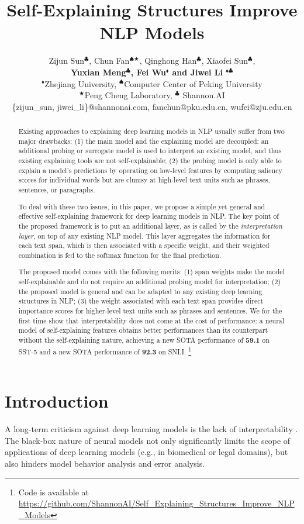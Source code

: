 \documentclass[11pt,a4paper]{article}
\title{Self-Explaining Structures Improve NLP Models}
\date{}
\author{
Zijun Sun$^\clubsuit$, Chun Fan$^{\spadesuit\bigstar}$, Qinghong Han$^\clubsuit$, Xiaofei Sun$^\clubsuit$, \\ 
{\bf Yuxian Meng$^\clubsuit$, Fei Wu$^\blacklozenge$ and Jiwei Li $^{\blacklozenge\clubsuit}$}\\
  $^\blacklozenge$Zhejiang University,
  $^\spadesuit$Computer Center of Peking University \\
  $^\bigstar$Peng Cheng Laboratory,  
  $^\clubsuit$ Shannon.AI\\
  \{zijun\_sun, jiwei\_li\}@shannonai.com,
  fanchun@pku.edu.cn,
  wufei@zju.edu.cn
}
\begin{document}
\maketitle

\begin{abstract}
Existing approaches to explaining deep learning models in NLP usually suffer from two major drawbacks:
(1) the main model and the explaining model are decoupled: 
an additional probing or surrogate model is used to  interpret an existing model, and  thus 
existing explaining tools
 are not self-explainable; (2) the probing model is only able to explain a model's predictions by operating on 
 low-level features  
by computing  saliency scores for individual words 
but  are clumsy  at  high-level text units such as phrases, sentences, or paragraphs. 


To deal with these two issues, in this paper, we propose a 
simple yet general and effective 
self-explaining framework  for deep learning models in NLP. 
The key point of the proposed framework is to put an additional layer, as is called by the {\it interpretation layer},  on top of any existing NLP model.  
This layer aggregates the information for each text span, which is then associated with a specific weight, and their weighted combination is fed to the softmax function for the final prediction. 

The proposed model comes with the following merits: 
(1) span weights make the model  self-explainable and do not require an additional probing model for interpretation; 
(2) the proposed model
 is general and can be adapted to any existing deep learning structures in NLP; 
(3) the weight associated with each text span 
 provides direct importance 
  scores for higher-level text units such as phrases and sentences.
We for the first time show that interpretability does not come at the cost of performance: 
a neural model of self-explaining features obtains better performances than its counterpart without the 
self-explaining nature, 
 achieving a new SOTA performance of {\bf 59.1} on SST-5 and 
  a new SOTA performance of {\bf 92.3} 
 on SNLI. \footnote{Code is available at \url{https://github.com/ShannonAI/Self_Explaining_Structures_Improve_NLP_Models}}
\end{abstract}




\section{Introduction} 
A long-term criticism against deep learning models is the lack of interpretability \cite{simonyan2013deep,bach2015lrp,montavon2017explaining,kindermans2017learning}. 
The black-box nature of neural models not only significantly limits the scope of applications of deep learning models (e.g., in  biomedical or legal domains), 
but also hinders model behavior analysis and error analysis. 
\end{document}
